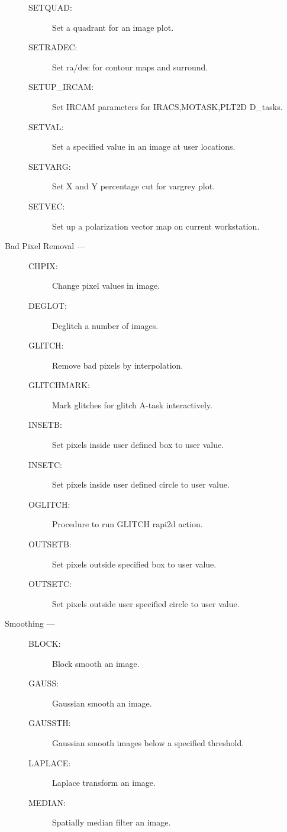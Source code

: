 \begin{description}
\begin{description}
\item [SETQUAD:]  Set a quadrant for an image plot.
\item [SETRADEC:]  Set ra/dec for contour maps and surround.
\item [SETUP\_IRCAM:]  Set IRCAM parameters for IRACS,MOTASK,PLT2D D\_tasks.
\item [SETVAL:]  Set a specified value in an image at user locations.
\item [SETVARG:]  Set X and Y percentage cut for vargrey plot.
\item [SETVEC:]  Set up a polarization vector map on current workstation.
\end{description}

\item [Bad Pixel Removal ---]
\begin{description}
\item [CHPIX:]  Change pixel values in image.
\item [DEGLOT:]  Deglitch a number of images.
\item [GLITCH:]  Remove bad pixels by interpolation.
\item [GLITCHMARK:]  Mark glitches for glitch A-task interactively.
\item [INSETB:]  Set pixels inside user defined box to user value.
\item [INSETC:]  Set pixels inside user defined circle to user value.
\item [OGLITCH:]  Procedure to run GLITCH rapi2d action.
\item [OUTSETB:]  Set pixels outside specified box to user value.
\item [OUTSETC:]  Set pixels outside user specified circle to user value.
\end{description}

\item [Smoothing ---]
\begin{description}
\item [BLOCK:]  Block smooth an image.
\item [GAUSS:]  Gaussian smooth an image.
\item [GAUSSTH:]  Gaussian smooth images below a specified threshold.
\item [LAPLACE:]  Laplace transform an image.
\item [MEDIAN:]  Spatially median filter an image.
\end{description}


\end{description}
